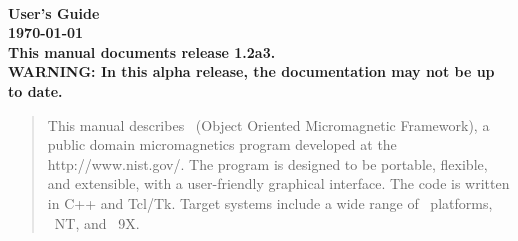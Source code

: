 
\usepackage{l2hbugs}




\nocite{*}  %


\begin{titlepage}
\label{page:contents}
\par
\vspace*{\fill}
\begin{center}
\Large\bf
\OOMMF\\
User's Guide\\[2ex]
\large
{\today}
{}\\[2ex]
This manual documents release 1.2a3.\\[1ex]
WARNING: In this alpha release, the
documentation may not be up to date.

\end{center}
\vspace{10\baselineskip}
\begin{abstract}
This manual describes \OOMMF\ (Object Oriented Micromagnetic Framework),
a public domain micromagnetics program developed at the
{http://www.nist.gov/}.  The program is designed
to be portable, flexible, and extensible, with a user-friendly graphical
interface.  The code is written in C++ and Tcl/Tk. Target systems
include a wide range of \Unix\ platforms, \Windows~NT, and
\Windows~9X.
\end{abstract}
\vspace*{\fill}
\par
\end{titlepage}

\begin{latexonly}
\tableofcontents
\end{latexonly}

